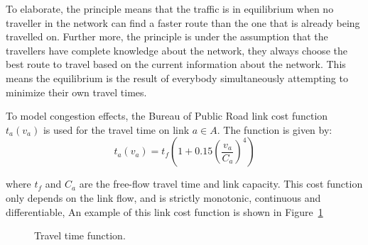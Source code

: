 To elaborate, the principle means that the traffic is in equilibrium when no traveller in the network can find a faster route than the one that is already being travelled on.
Further more, the principle is under the assumption that the travellers have complete knowledge about the network,
they always choose the best route to travel based on the current information about the network.
This means the equilibrium is the result of everybody simultaneously attempting to minimize their own travel times.

To model congestion effects,
the Bureau of Public Road link cost function 
$t_a(v_a)$ is used for the travel time on link $a \in A$.
The function is given by:
\begin{equation}
    t_a(v_a) = t_f \left(1 + 0.15\left( \frac{v_a}{C_a} \right)^4 \right)
\end{equation}

where $t_f$ and $C_a$ are the free-flow travel time and link capacity.
This cost function only depends on the link flow, and is strictly monotonic, continuous and differentiable,
An example of this link cost function is shown in Figure~\ref{fig:flowfunction}

\begin{figure}
    \centering
    \caption{Travel time function.}
    \label{fig:flowfunction}
\end{figure}

